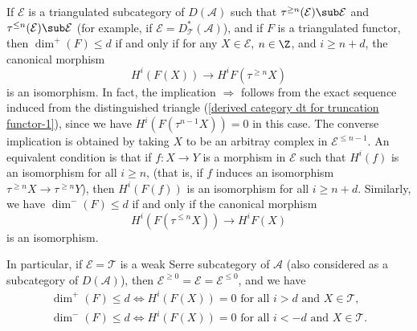 \begin{example}\label{derived category functor dim leq d iff truncation quasi-isomorphism}
If $\mathcal{E}$ is a triangulated subcategory of $D(\mathcal{A})$ such that $\tau^{\geq n}(\mathcal{E})\sub\mathcal{E}$ and $\tau^{\leq n}(\mathcal{E})\sub\mathcal{E}$ (for example, if $\mathcal{E}=D_\mathcal{T}^*(\mathcal{A})$), and if $F$ is a triangulated functor, then $\dim^+(F)\leq d$ if and only if for any $X\in\mathcal{E}$, $n\in\Z$, and $i\geq n+d$, the canonical morphism
\[H^i(F(X))\to H^iF(\tau^{\geq n}X)\]
is an isomorphism. In fact, the implication $\Rightarrow$ follows from the exact sequence induced from the distinguished triangle (\ref{derived category dt for truncation functor-1}), since we have $H^i(F(\tau^{n-1}X))=0$ in this case. The converse implication is obtained by taking $X$ to be an arbitray complex in $\mathcal{E}^{\leq n-1}$. An equivalent condition is that if $f:X\to Y$ is a morphism in $\mathcal{E}$ such that $H^i(f)$ is an isomorphism for all $i\geq n$, (that is, if $f$ induces an isomorphism $\tau^{\geq n}X\to \tau^{\geq n}Y$), then $H^i(F(f))$ is an isomorphism for all $i\geq n+d$. Similarly, we have $\dim^-(F)\leq d$ if and only if the canonical morphism
\[H^i(F(\tau^{\leq n}X))\to H^iF(X)\]
is an isomorphism.\par
In particular, if $\mathcal{E}=\mathcal{T}$ is a weak Serre subcategory of $\mathcal{A}$ (also considered as a subcategory of $D(\mathcal{A})$), then $\mathcal{E}^{\geq 0}=\mathcal{E}=\mathcal{E}^{\leq 0}$, and we have
\begin{gather*}
\dim^+(F)\leq d\Leftrightarrow \text{$H^i(F(X))=0$ for all $i>d$ and $X\in\mathcal{T}$},\\
\dim^-(F)\leq d\Leftrightarrow \text{$H^i(F(X))=0$ for all $i<-d$ and $X\in\mathcal{T}$}.
\end{gather*}
\end{example}

